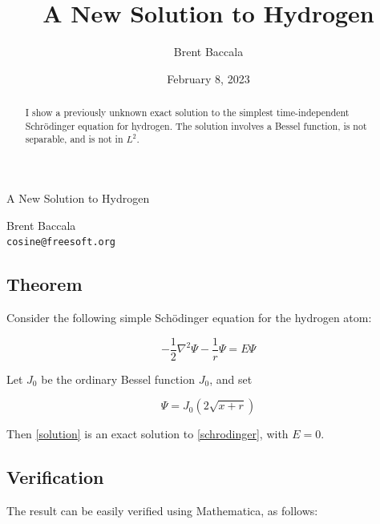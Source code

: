 \documentclass{article}
\title{A New Solution to Hydrogen}
\author{Brent Baccala}
\date{February 8, 2023}
\begin{document}
\parindent 0pt

\begin{center}
\Large
A New Solution to Hydrogen
\end{center}

\begin{center}
Brent Baccala \\
\verb+cosine@freesoft.org+
\end{center}

\begin{abstract}
I show a previously unknown exact solution to the simplest time-independent Schr\"odinger equation for hydrogen.
The solution involves a Bessel function, is not separable, and is not in $L^2$.
\end{abstract}

\subsection*{Theorem}

Consider the following simple Sch\"odinger equation for the hydrogen atom:

\begin{equation}
\label{schrodinger}
-\frac{1}{2}\nabla^2 \Psi - \frac{1}{r}\Psi = E \Psi
\end{equation}

Let $J_0$ be the ordinary Bessel function $J_0$, and set

\begin{equation}
\label{solution}
\Psi = J_0(2\sqrt{x+r})
\end{equation}

Then \eqref{solution} is an exact solution to \eqref{schrodinger}, with $E=0$.

\subsection*{Verification}

The result can be easily verified using Mathematica, as follows:
\end{document}
